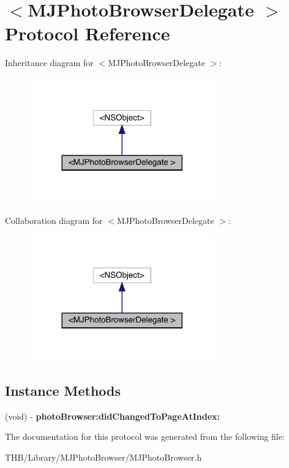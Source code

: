 \hypertarget{protocol_m_j_photo_browser_delegate_01-p}{}\section{$<$M\+J\+Photo\+Browser\+Delegate $>$ Protocol Reference}
\label{protocol_m_j_photo_browser_delegate_01-p}


Inheritance diagram for $<$M\+J\+Photo\+Browser\+Delegate $>$\+:\nopagebreak
\begin{figure}[H]
\begin{center}
\leavevmode
\includegraphics[width=227pt]{protocol_m_j_photo_browser_delegate_01-p__inherit__graph}
\end{center}
\end{figure}


Collaboration diagram for $<$M\+J\+Photo\+Browser\+Delegate $>$\+:\nopagebreak
\begin{figure}[H]
\begin{center}
\leavevmode
\includegraphics[width=227pt]{protocol_m_j_photo_browser_delegate_01-p__coll__graph}
\end{center}
\end{figure}
\subsection*{Instance Methods}
\begin{DoxyCompactItemize}
\item 
\mbox{\label{protocol_m_j_photo_browser_delegate_01-p_ade1b4311c9db7f733d12a85c339c5653}} 
(void) -\/ {\bfseries photo\+Browser\+:did\+Changed\+To\+Page\+At\+Index\+:}
\end{DoxyCompactItemize}


The documentation for this protocol was generated from the following file\+:\begin{DoxyCompactItemize}
\item 
T\+H\+B/\+Library/\+M\+J\+Photo\+Browser/M\+J\+Photo\+Browser.\+h\end{DoxyCompactItemize}
